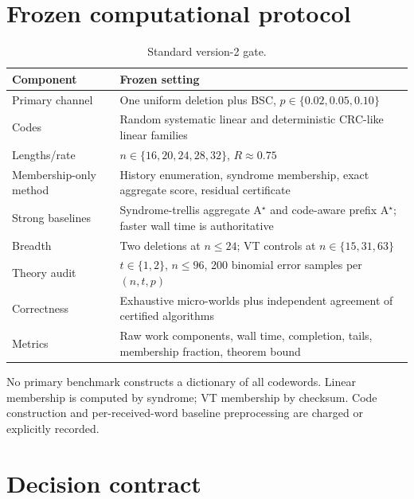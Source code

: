 \documentclass[11pt]{article}
\theoremstyle{definition}
\theoremstyle{remark}
\begin{document}
\section{Frozen computational protocol}
\begin{table}[h]
\centering
\caption{Standard version-2 gate.}
\begin{tabularx}{\textwidth}{@{}lX@{}}
\toprule
Component & Frozen setting \\
\midrule
Primary channel & One uniform deletion plus BSC, $p\in\{0.02,0.05,0.10\}$ \\
Codes & Random systematic linear and deterministic CRC-like linear families \\
Lengths/rate & $n\in\{16,20,24,28,32\}$, $R\approx0.75$ \\
Membership-only method & History enumeration, syndrome membership, exact aggregate score, residual certificate \\
Strong baselines & Syndrome-trellis aggregate A$^\star$ and code-aware prefix A$^\star$; faster wall time is authoritative \\
Breadth & Two deletions at $n\le24$; VT controls at $n\in\{15,31,63\}$ \\
Theory audit & $t\in\{1,2\}$, $n\le96$, 200 binomial error samples per $(n,t,p)$ \\
Correctness & Exhaustive micro-worlds plus independent agreement of certified algorithms \\
Metrics & Raw work components, wall time, completion, tails, membership fraction, theorem bound \\
\bottomrule
\end{tabularx}
\end{table}

No primary benchmark constructs a dictionary of all codewords.  Linear membership is computed by syndrome; VT membership by checksum.  Code construction and per-received-word baseline preprocessing are charged or explicitly recorded.

\section{Decision contract}
\end{document}
